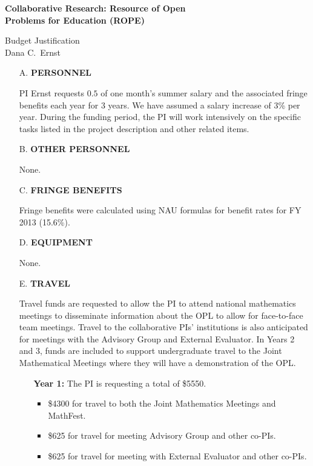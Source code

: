 \documentclass[11pt]{article}
\begin{document}
\begin{center}
{\Large \textbf{Collaborative Research: Resource of Open\\
Problems for Education (ROPE)}}

\bigskip

{\Large Budget Justification}\\
\smallskip
Dana C.~Ernst
\end{center}

\begin{enumerate}[leftmargin=*]

\item[A.] \textbf{PERSONNEL}

PI Ernst requests $0.5$ of one month's summer salary and the associated fringe benefits each year for 3 years. We have assumed a salary increase of 3\% per year.  During the funding period, the PI will work intensively on the specific tasks listed in the project description and other related items. \hfill {}

\item[B.] \textbf{OTHER PERSONNEL}

None. \hfill {}

\item[C.] \textbf{FRINGE BENEFITS}

Fringe benefits were calculated using NAU formulas for benefit rates for FY 2013 (15.6\%).

\hfill {}

\item[D.] \textbf{EQUIPMENT}

None. \hfill {}

\item[E.] \textbf{TRAVEL}

Travel funds are requested to allow the PI to attend national mathematics meetings to disseminate information about the OPL to allow for face-to-face team meetings.  Travel to the collaborative PIs' institutions is also anticipated for meetings with the Advisory Group and External Evaluator. In Years 2 and 3, funds are included to support undergraduate travel to the Joint Mathematical Meetings where they will have a demonstration of the OPL.

\begin{enumerate}
\item[] \textbf{Year 1:} The PI is requesting a total of \$5550.
\begin{itemize}
\item \$4300 for travel to both the Joint Mathematics Meetings and MathFest.
\item \$625 for travel for meeting Advisory Group and other co-PIs.
\item \$625 for travel for meeting with External Evaluator and other co-PIs.
\end{itemize}


\end{enumerate}
\end{enumerate}
\end{document}
